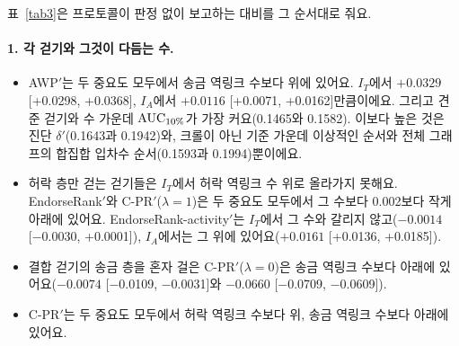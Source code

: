 표~\ref{tab3}은 프로토콜이 판정 없이 보고하는 대비를 그 순서대로 줘요.

\paragraph{1. 각 걷기와 그것이 다듬는 수.}
\begin{itemize}
\item AWP$'$는 두 중요도 모두에서 송금 역링크 수보다 위에 있어요. $I_T$에서 $+0.0329$ [+0.0298, +0.0368], $I_A$에서 $+0.0116$ [+0.0071, +0.0162]만큼이에요. 그리고 견준 걷기와 수 가운데 $\mathrm{AUC}_{10\%}$가 가장 커요(0.1465와 0.1582). 이보다 높은 것은 진단 $\delta'$(0.1643과 0.1942)와, 크롤이 아닌 기준 가운데 이상적인 순서와 전체 그래프의 합집합 입차수 순서(0.1593과 0.1994)뿐이에요.
\item 허락 층만 걷는 걷기들은 $I_T$에서 허락 역링크 수 위로 올라가지 못해요. EndorseRank$'$와 C-PR$'$($\lambda{=}1$)은 두 중요도 모두에서 그 수보다 0.002보다 작게 아래에 있어요. EndorseRank-activity$'$는 $I_T$에서 그 수와 갈리지 않고($-0.0014$ [−0.0030, +0.0001]), $I_A$에서는 그 위에 있어요($+0.0161$ [+0.0136, +0.0185]).
\item 결합 걷기의 송금 층을 혼자 걸은 C-PR$'$($\lambda{=}0$)은 송금 역링크 수보다 아래에 있어요($-0.0074$ [−0.0109, −0.0031]와 $-0.0660$ [−0.0709, −0.0609]).
\item C-PR$'$는 두 중요도 모두에서 허락 역링크 수보다 위, 송금 역링크 수보다 아래에 있어요.
\end{itemize}

